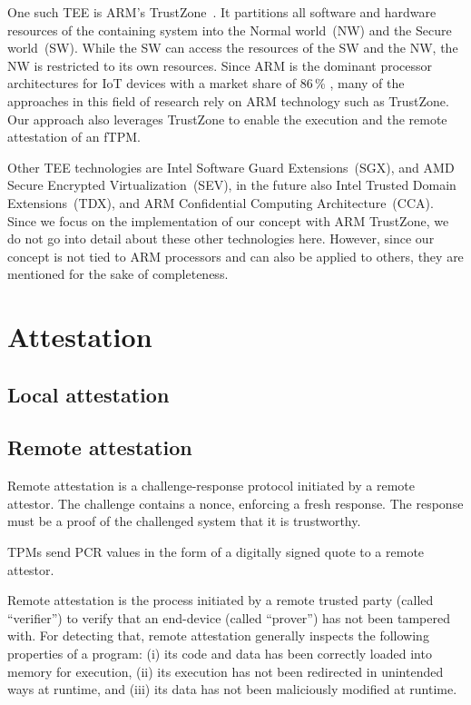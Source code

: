 One such \ac{TEE} is ARM's TrustZone~\cite{ARM09}. It partitions all software and hardware resources of the containing system into the Normal world~(NW) and the Secure world~(SW).
While the SW can access the resources of the SW and the NW, the NW is restricted to its own resources.
Since ARM is the dominant processor architectures for IoT devices with a market share of 86\,\% \cite{eclipse}, many of the approaches in this field of research rely on ARM technology such as TrustZone.
Our approach also leverages TrustZone to enable the execution and the remote attestation of an fTPM.

Other \ac{TEE} technologies are Intel Software Guard Extensions~(SGX), and AMD Secure Encrypted Virtualization~(SEV), in the future also Intel Trusted Domain Extensions~(TDX), and ARM Confidential Computing Architecture~(CCA). Since we focus on the implementation of our concept with ARM TrustZone, we do not go into detail about these other technologies here. However, since our concept is not tied to ARM processors and can also be applied to others, they are mentioned for the sake of completeness.




\section{Attestation}
\subsection{Local attestation}
\subsection{Remote attestation}

Remote attestation is a challenge-response protocol initiated by a remote attestor.
The challenge contains a nonce, enforcing a fresh response.
The response must be a proof of the challenged system that it is trustworthy.

TPMs send PCR values in the form of a digitally signed quote to a remote attestor.

Remote attestation is the process initiated by a remote trusted party (called ``verifier'') to verify that an end-device (called ``prover'') has not been tampered with. For detecting that, remote attestation generally inspects the following properties of a program: (i) its code and data has been correctly loaded into memory for execution, (ii) its execution has not been redirected in unintended ways at runtime, and (iii) its data has not been maliciously modified at runtime.

